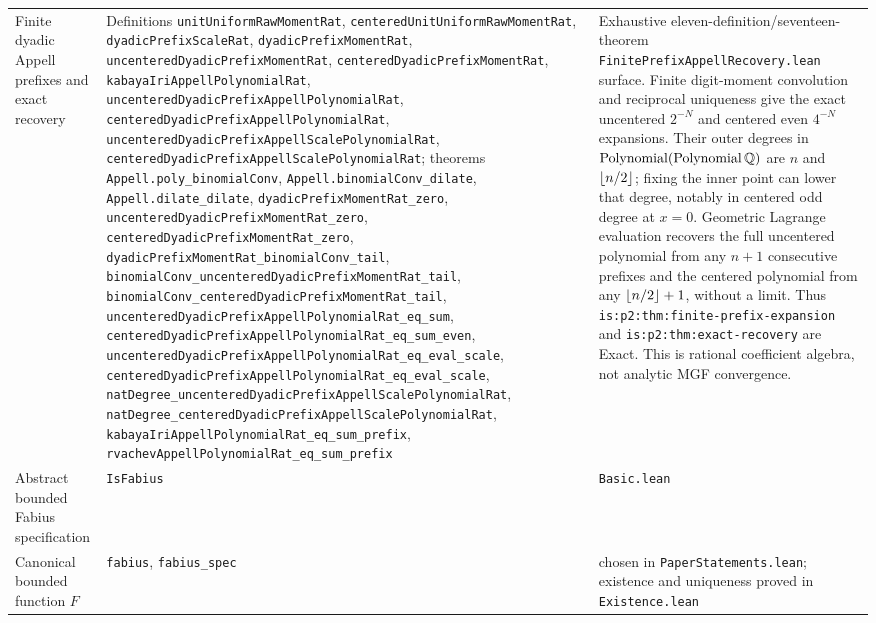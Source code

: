 \documentclass[11pt,oneside]{article}
\theoremstyle{definition}
\theoremstyle{remark}
\begin{document}
\begin{longtable}{@{}>{\raggedright\arraybackslash}p{} >{\raggedright\arraybackslash}p{} >{\raggedright\arraybackslash}p{}@{}}
Finite dyadic Appell prefixes and exact recovery & Definitions \nolinkurl{unitUniformRawMomentRat}, \nolinkurl{centeredUnitUniformRawMomentRat}, \nolinkurl{dyadicPrefixScaleRat}, \nolinkurl{dyadicPrefixMomentRat}, \nolinkurl{uncenteredDyadicPrefixMomentRat}, \nolinkurl{centeredDyadicPrefixMomentRat}, \nolinkurl{kabayaIriAppellPolynomialRat}, \nolinkurl{uncenteredDyadicPrefixAppellPolynomialRat}, \nolinkurl{centeredDyadicPrefixAppellPolynomialRat}, \nolinkurl{uncenteredDyadicPrefixAppellScalePolynomialRat}, \nolinkurl{centeredDyadicPrefixAppellScalePolynomialRat}; theorems \nolinkurl{Appell.poly_binomialConv}, \nolinkurl{Appell.binomialConv_dilate}, \nolinkurl{Appell.dilate_dilate}, \nolinkurl{dyadicPrefixMomentRat_zero}, \nolinkurl{uncenteredDyadicPrefixMomentRat_zero}, \nolinkurl{centeredDyadicPrefixMomentRat_zero}, \nolinkurl{dyadicPrefixMomentRat_binomialConv_tail}, \nolinkurl{binomialConv_uncenteredDyadicPrefixMomentRat_tail}, \nolinkurl{binomialConv_centeredDyadicPrefixMomentRat_tail}, \nolinkurl{uncenteredDyadicPrefixAppellPolynomialRat_eq_sum}, \nolinkurl{centeredDyadicPrefixAppellPolynomialRat_eq_sum_even}, \nolinkurl{uncenteredDyadicPrefixAppellPolynomialRat_eq_eval_scale}, \nolinkurl{centeredDyadicPrefixAppellPolynomialRat_eq_eval_scale}, \nolinkurl{natDegree_uncenteredDyadicPrefixAppellScalePolynomialRat}, \nolinkurl{natDegree_centeredDyadicPrefixAppellScalePolynomialRat}, \nolinkurl{kabayaIriAppellPolynomialRat_eq_sum_prefix}, \nolinkurl{rvachevAppellPolynomialRat_eq_sum_prefix} & Exhaustive eleven-definition/seventeen-theorem \nolinkurl{FinitePrefixAppellRecovery.lean} surface.  Finite digit-moment convolution and reciprocal uniqueness give the exact uncentered \(2^{-N}\) and centered even \(4^{-N}\) expansions.  Their outer degrees in \(\operatorname{Polynomial}(\operatorname{Polynomial}\mathbb{Q})\) are \(n\) and \(\left\lfloor n/2\right\rfloor\); fixing the inner point can lower that degree, notably in centered odd degree at \(x=0\).  Geometric Lagrange evaluation recovers the full uncentered polynomial from any \(n+1\) consecutive prefixes and the centered polynomial from any \(\left\lfloor n/2\right\rfloor+1\), without a limit.  Thus \nolinkurl{is:p2:thm:finite-prefix-expansion} and \nolinkurl{is:p2:thm:exact-recovery} are Exact.  This is rational coefficient algebra, not analytic MGF convergence. \\
Abstract bounded Fabius specification & \nolinkurl{IsFabius} & \nolinkurl{Basic.lean} \\
Canonical bounded function \(F\) & \nolinkurl{fabius}, \nolinkurl{fabius_spec} & chosen in \nolinkurl{PaperStatements.lean}; existence and uniqueness proved in \nolinkurl{Existence.lean} \\

\end{longtable}
\end{document}

